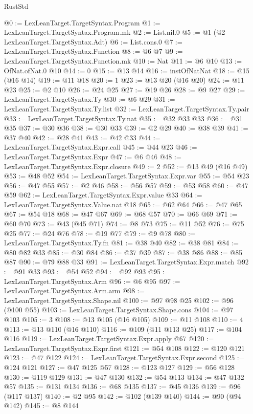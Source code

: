 \begin{lexlean}{RustStd}
\begin{coremodule}
{\begin{coremodule}
{{{{{{{{{{@0 := LexLeanTarget.TargetSyntax.Program
@1 := LexLeanTarget.TargetSyntax.Program.mk
@2 := List.nil.{0}
@5 := @1 (@2 LexLeanTarget.TargetSyntax.Adt)
@6 := List.cons.{0}
@7 := LexLeanTarget.TargetSyntax.Function
@8 := @6 @7
@9 := LexLeanTarget.TargetSyntax.Function.mk
@10 := Nat
@11 := @6 @10
@13 := OfNat.ofNat.{0} @10
@14 := 0
@15 := @13 @14
@16 := instOfNatNat
@18 := @15 (@16 @14)
@19 := @11 @18
@20 := 1
@23 := @13 @20 (@16 @20)
@24 := @11 @23
@25 := @2 @10
@26 := @24 @25
@27 := @19 @26
@28 := @9 @27
@29 := LexLeanTarget.TargetSyntax.Ty
@30 := @6 @29
@31 := LexLeanTarget.TargetSyntax.Ty.list
@32 := LexLeanTarget.TargetSyntax.Ty.pair
@33 := LexLeanTarget.TargetSyntax.Ty.nat
@35 := @32 @33 @33
@36 := @31 @35
@37 := @30 @36
@38 := @30 @33
@39 := @2 @29
@40 := @38 @39
@41 := @37 @40
@42 := @28 @41
@43 := @42 @33
@44 := LexLeanTarget.TargetSyntax.Expr.call
@45 := @44 @23
@46 := LexLeanTarget.TargetSyntax.Expr
@47 := @6 @46
@48 := LexLeanTarget.TargetSyntax.Expr.closure
@49 := 2
@52 := @13 @49 (@16 @49)
@53 := @48 @52
@54 := LexLeanTarget.TargetSyntax.Expr.var
@55 := @54 @23
@56 := @47 @55
@57 := @2 @46
@58 := @56 @57
@59 := @53 @58
@60 := @47 @59
@62 := LexLeanTarget.TargetSyntax.Expr.value @33
@64 := LexLeanTarget.TargetSyntax.Value.nat @18
@65 := @62 @64
@66 := @47 @65
@67 := @54 @18
@68 := @47 @67
@69 := @68 @57
@70 := @66 @69
@71 := @60 @70
@73 := @43 (@45 @71)
@74 := @8 @73
@75 := @11 @52
@76 := @75 @25
@77 := @24 @76
@78 := @19 @77
@79 := @9 @78
@80 := LexLeanTarget.TargetSyntax.Ty.fn
@81 := @38 @40
@82 := @38 @81
@84 := @80 @82 @33
@85 := @30 @84
@86 := @37 @39
@87 := @38 @86
@88 := @85 @87
@90 := @79 @88 @33
@91 := LexLeanTarget.TargetSyntax.Expr.match
@92 := @91 @33
@93 := @54 @52
@94 := @92 @93
@95 := LexLeanTarget.TargetSyntax.Arm
@96 := @6 @95
@97 := LexLeanTarget.TargetSyntax.Arm.arm
@98 := LexLeanTarget.TargetSyntax.Shape.nil
@100 := @97 @98 @25
@102 := @96 (@100 @55)
@103 := LexLeanTarget.TargetSyntax.Shape.cons
@104 := @97 @103
@105 := 3
@108 := @13 @105 (@16 @105)
@109 := @11 @108
@110 := 4
@113 := @13 @110 (@16 @110)
@116 := @109 (@11 @113 @25)
@117 := @104 @116
@119 := LexLeanTarget.TargetSyntax.Expr.apply @67
@120 := LexLeanTarget.TargetSyntax.Expr.first
@121 := @54 @108
@122 := @120 @121
@123 := @47 @122
@124 := LexLeanTarget.TargetSyntax.Expr.second
@125 := @124 @121
@127 := @47 @125 @57
@128 := @123 @127
@129 := @56 @128
@130 := @119 @129
@131 := @47 @130
@132 := @54 @113
@134 := @47 @132 @57
@135 := @131 @134
@136 := @68 @135
@137 := @45 @136
@139 := @96 (@117 @137)
@140 := @2 @95
@142 := @102 (@139 @140)
@144 := @90 (@94 @142)
@145 := @8 @144
}}}}}}}}}}
\end{coremodule}}
\end{coremodule}
\end{lexlean}
